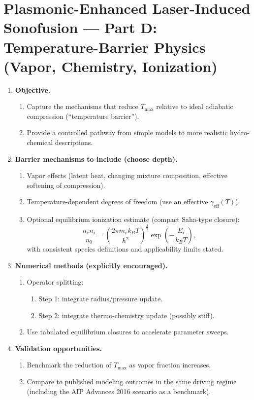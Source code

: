 \documentclass[11pt]{article}
\begin{document}
	\section{Plasmonic-Enhanced Laser-Induced Sonofusion --- Part D: Temperature-Barrier Physics (Vapor, Chemistry, Ionization)}
	\begin{enumerate}
		\item \textbf{Objective.}
		\begin{enumerate}
			\item Capture the mechanisms that reduce $T_{\max}$ relative to ideal adiabatic compression (``temperature barrier'').
			\item Provide a controlled pathway from simple models to more realistic hydro-chemical descriptions.
		\end{enumerate}
		
		\item \textbf{Barrier mechanisms to include (choose depth).}
		\begin{enumerate}
			\item Vapor effects (latent heat, changing mixture composition, effective softening of compression).
			\item Temperature-dependent degrees of freedom (use an effective $\gamma_{\mathrm{eff}}(T)$).
			\item Optional equilibrium ionization estimate (compact Saha-type closure):
			\[
			\frac{n_e n_i}{n_0}
			=
			\left(\dfrac{2\pi m_e k_B T}{h^2}\right)^{\!\frac{3}{2}}
			\exp\!\left(-\dfrac{E_i}{k_B T}\right),
			\]
			with consistent species definitions and applicability limits stated.
		\end{enumerate}
		
		\item \textbf{Numerical methods (explicitly encouraged).}
		\begin{enumerate}
			\item Operator splitting:
			\begin{enumerate}
				\item Step 1: integrate radius/pressure update.
				\item Step 2: integrate thermo-chemistry update (possibly stiff).
			\end{enumerate}
			\item Use tabulated equilibrium closures to accelerate parameter sweeps.
		\end{enumerate}
		
		\item \textbf{Validation opportunities.}
		\begin{enumerate}
			\item Benchmark the reduction of $T_{\max}$ as vapor fraction increases.
			\item Compare to published modeling outcomes in the same driving regime (including the AIP Advances 2016 scenario as a benchmark).
		\end{enumerate}
		

\end{enumerate}
\end{document}
